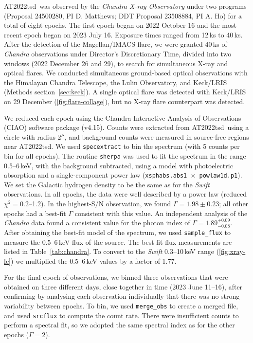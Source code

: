 \documentclass{nature_plusfigure}
\newcommand{\at}{AT2022tsd}
\begin{document}
\begin{methods}
\at\ was observed by the \emph{Chandra X-ray Observatory} under two programs (Proposal 24500280, PI D. Matthews; DDT Proposal 23508884, PI A. Ho) for a total of eight epochs. The first epoch began on 2022 October 16 and the most recent epoch began on 2023 July 16. Exposure times ranged from 12\,ks to 40\,ks.
After the detection of the Magellan/IMACS flare, we were granted
40\,ks of {\it Chandra} observations under Director's Discretionary Time, divided into two windows (2022 December 26 and 29), to search for simultaneous X-ray and optical flares.
We conducted simultaneous ground-based optical observations with the Himalayan Chandra Telescope, the Lulin Observatory, and Keck/LRIS (Methods section~\ref{sec:keck}).
A single optical flare was detected with Keck/LRIS on 29 December (\ref{fig:flare-collage}), but no X-ray flare counterpart was detected.

We reduced each epoch using the Chandra Interactive Analysis of Observations (CIAO\cite{Fruscione2006}) software package (v4.15). Counts were extracted from \at\ using a circle with radius $2''$, and background counts were measured in source-free regions near \at.
We used \texttt{specextract} to bin the spectrum (with 5 counts per bin for all epochs). The routine \texttt{sherpa} was used to fit the spectrum in the range 0.5--6\,keV, with the background subtracted, using a model with photoelectric absorption and a single-component power law (\texttt{xsphabs.abs1 $\times$ powlaw1d.p1}). We set the Galactic hydrogen density to be the same as for the \emph{Swift} observations. In all epochs, the data were well described by a power law (reduced $\chi^2=0.2$--1.2). In the highest-S/N observation, we found $\Gamma=1.98\pm0.23$; all other epochs had a best-fit $\Gamma$ consistent with this value.
An independent analysis of the {\it Chandra} data\cite{Matthews2023} found a consistent value for the photon index of $\Gamma=1.89^{+0.09}_{-0.08}$.
After obtaining the best-fit model of the spectrum, we used \texttt{sample\_flux} to measure the 0.5--6\,keV flux of the source. The best-fit flux measurements are listed in Table~\ref{tab:chandra}. To convert to the \emph{Swift} 0.3--10\,keV range (\ref{fig:xray-lc}) we multiplied the 0.5--6\,keV values by a factor of 1.77.

For the final epoch of observations, we binned three observations that were obtained on three different days, close together in time (2023 June 11--16), after confirming by analysing each observation individually that there was no strong variability between epochs. To bin, we used \texttt{merge\_obs} to create a merged file, and used \texttt{srcflux} to compute the count rate. There were insufficient counts to perform a spectral fit, so we adopted the same spectral index as for the other epochs ($\Gamma=2$). 


\end{methods}
\end{document}
